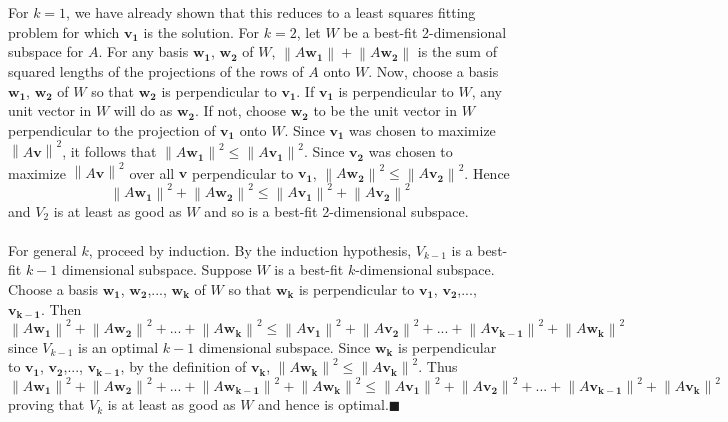 \documentclass{tufte-handout}
\newcommand{\norm}[1]{\left\lVert#1\right\rVert}
\renewcommand{\qedsymbol}{$\blacksquare$}
\begin{document}
\\\leavevmode\\

\noindent For $k=1$, we have already shown that this reduces to a least squares fitting problem for which $\mathbf{v_1}$ is the solution. For $k = 2$, let $W$ be a best-fit 2-dimensional subspace for $A$. For any basis $\mathbf{w_1}$, $\mathbf{w_2}$ of $W$, $\norm{A\mathbf{w_1}}+\norm{A\mathbf{w_2}}$ is the sum of
squared lengths of the projections of the rows of $A$ onto $W$. Now, choose a basis $\mathbf{w_1}$, $\mathbf{w_2}$ of $W$ so that $\mathbf{w_2}$ is perpendicular to $\mathbf{v_1}$. If $\mathbf{v_1}$ is perpendicular to $W$, any unit vector in $W$ will do as $\mathbf{w_2}$. If not, choose $\mathbf{w_2}$ to be the unit vector in $W$ perpendicular to the projection of $\mathbf{v_1}$ onto $W$. Since $\mathbf{v_1}$ was chosen to maximize $\norm{A\mathbf{v}}^2$, it follows that $\norm{A\mathbf{w_1}}^2\leq\norm{A\mathbf{v_1}}^2$. Since $\mathbf{v_2}$ was chosen to maximize $\norm{A\mathbf{v}}^2$ over all $\mathbf{v}$ perpendicular to $\mathbf{v_1}$, $\norm{A\mathbf{w_2}}^2\leq\norm{A\mathbf{v_2}}^2$. Hence
\[
\norm{A\mathbf{w_1}}^2+\norm{A\mathbf{w_2}}^2
\leq
\norm{A\mathbf{v_1}}^2+\norm{A\mathbf{v_2}}^2
\]
and $V_2$ is at least as good as $W$ and so is a best-fit 2-dimensional subspace.\\\leavevmode\\

\noindent For general $k$, proceed by induction. By the induction hypothesis, $V_{k-1}$ is a best-fit $k-1$ dimensional subspace. Suppose $W$ is a best-fit $k$-dimensional subspace. Choose a basis $\mathbf{w_1}$, $\mathbf{w_2}$,..., $\mathbf{w_k}$ of $W$ so that $\mathbf{w_k}$ is perpendicular to $\mathbf{v_1}$, $\mathbf{v_2}$,..., $\mathbf{v_{k-1}}$. Then
\[
\norm{A\mathbf{w_1}}^2+\norm{A\mathbf{w_2}}^2+...+\norm{A\mathbf{w_k}}^2
\leq
\norm{A\mathbf{v_1}}^2+\norm{A\mathbf{v_2}}^2+...+\norm{A\mathbf{v_{k-1}}}^2+\norm{A\mathbf{w_k}}^2
\]
since $V_{k-1}$ is an optimal $k-1$ dimensional subspace. Since $\mathbf{w_k}$ is perpendicular to
$\mathbf{v_1}$, $\mathbf{v_2}$,..., $\mathbf{v_{k-1}}$, by the definition of $\mathbf{v_k}$, $\norm{A\mathbf{w_k}}^2\leq\norm{A\mathbf{v_k}}^2$. Thus
\[
\norm{A\mathbf{w_1}}^2+\norm{A\mathbf{w_2}}^2+...+\norm{A\mathbf{w_{k-1}}}^2+\norm{A\mathbf{w_k}}^2
\leq
\norm{A\mathbf{v_1}}^2+\norm{A\mathbf{v_2}}^2+...+\norm{A\mathbf{v_{k-1}}}^2+\norm{A\mathbf{v_k}}^2
\]
proving that $V_k$ is at least as good as $W$ and hence is optimal.\quad\qedsymbol\\\leavevmode\\
\end{document}
